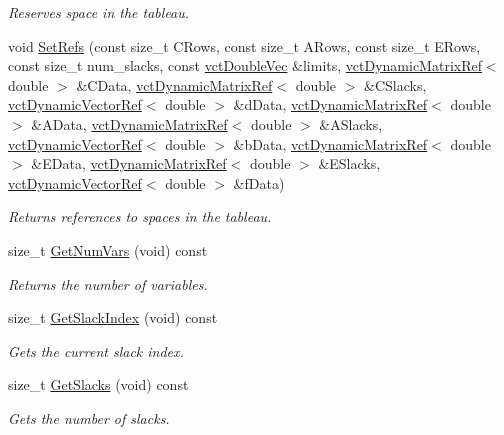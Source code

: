 \begin{DoxyCompactItemize}
\begin{DoxyCompactList}\small\item\em Reserves space in the tableau. \end{DoxyCompactList}\item 
void \hyperlink{classnmr_constraint_optimizer_af4181e4effd604d36c3b16f01b475ad7}{Set\+Refs} (const size\+\_\+t C\+Rows, const size\+\_\+t A\+Rows, const size\+\_\+t E\+Rows, const size\+\_\+t num\+\_\+slacks, const \hyperlink{vct_dynamic_vector_types_8h_ade4b3068c86fb88f41af2e5187e491c2}{vct\+Double\+Vec} \&limits, \hyperlink{classvct_dynamic_matrix_ref}{vct\+Dynamic\+Matrix\+Ref}$<$ double $>$ \&C\+Data, \hyperlink{classvct_dynamic_matrix_ref}{vct\+Dynamic\+Matrix\+Ref}$<$ double $>$ \&C\+Slacks, \hyperlink{classvct_dynamic_vector_ref}{vct\+Dynamic\+Vector\+Ref}$<$ double $>$ \&d\+Data, \hyperlink{classvct_dynamic_matrix_ref}{vct\+Dynamic\+Matrix\+Ref}$<$ double $>$ \&A\+Data, \hyperlink{classvct_dynamic_matrix_ref}{vct\+Dynamic\+Matrix\+Ref}$<$ double $>$ \&A\+Slacks, \hyperlink{classvct_dynamic_vector_ref}{vct\+Dynamic\+Vector\+Ref}$<$ double $>$ \&b\+Data, \hyperlink{classvct_dynamic_matrix_ref}{vct\+Dynamic\+Matrix\+Ref}$<$ double $>$ \&E\+Data, \hyperlink{classvct_dynamic_matrix_ref}{vct\+Dynamic\+Matrix\+Ref}$<$ double $>$ \&E\+Slacks, \hyperlink{classvct_dynamic_vector_ref}{vct\+Dynamic\+Vector\+Ref}$<$ double $>$ \&f\+Data)
\begin{DoxyCompactList}\small\item\em Returns references to spaces in the tableau. \end{DoxyCompactList}\item 
size\+\_\+t \hyperlink{classnmr_constraint_optimizer_ad0f0cc81edb92ebab781f24fddd17baf}{Get\+Num\+Vars} (void) const 
\begin{DoxyCompactList}\small\item\em Returns the number of variables. \end{DoxyCompactList}\item 
size\+\_\+t \hyperlink{classnmr_constraint_optimizer_adfcdfabcb97d1867b6f986e825fb2f98}{Get\+Slack\+Index} (void) const 
\begin{DoxyCompactList}\small\item\em Gets the current slack index. \end{DoxyCompactList}\item 
size\+\_\+t \hyperlink{classnmr_constraint_optimizer_a322ea4c8c390d4afc6eb8414ac59b3cf}{Get\+Slacks} (void) const 
\begin{DoxyCompactList}\small\item\em Gets the number of slacks. \end{DoxyCompactList}\item 

\end{DoxyCompactItemize}
